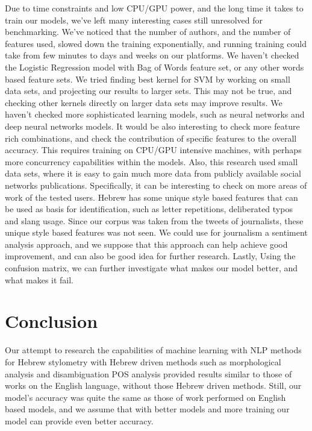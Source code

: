 \documentclass[a4paper]{article}
\begin{document}
Due to time constraints and low CPU/GPU power, and the long time it takes to train our models, we've left many interesting cases still unresolved for benchmarking.
We've noticed that the number of authors, and the number of features used, slowed down the training exponentially, and running training could take from few minutes to days and weeks on our platforms.
We haven't checked the Logistic Regression model with Bag of Words feature set, or any other words based feature sets.
We tried finding best kernel for SVM by working on small data sets, and projecting our results to larger sets. This may not be true, and checking other kernels directly on larger data sets may improve results.
We haven't checked more sophisticated learning models, such as neural networks and deep neural networks models.
It would be also interesting to check more feature rich combinations, and check the contribution of specific features to the overall accuracy. This requires training on CPU/GPU intensive machines, with perhaps more concurrency capabilities within the models.
Also, this research used small data sets, where it is easy to gain much more data from publicly available social networks publications.
Specifically, it can be interesting to check on more areas of work of the tested users.
Hebrew has some unique style based features that can be used as basis for identification, such as letter repetitions, deliberated typos and slang usage. Since our corpus was taken from the tweets of journalists, these unique style based features was not seen.
We could use for journalism a sentiment analysis approach, and we suppose that this approach can help achieve good improvement, and can also be good idea for further research.
Lastly, Using the confusion matrix, we can further investigate what makes our model better, and what makes it fail.

\section{Conclusion}
\label{Conclusion}

Our attempt to research the capabilities of machine learning with NLP methods for Hebrew stylometry with Hebrew driven methods such as morphological analysis and disambiguation POS analysis provided results similar to those of works on the English language, without those Hebrew driven methods.
Still, our model's accuracy was quite the same as those of work performed on English based models, and we assume that with better models and more training our model can provide even better accuracy.
\end{document}
